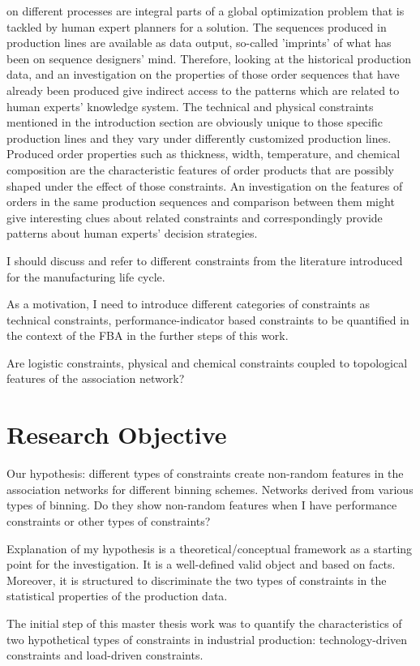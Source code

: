 {on different processes are integral parts of a global optimization problem that is tackled by human expert planners for a solution. The sequences produced in production lines are available as data output, so-called 'imprints' of what has been on sequence designers' mind. Therefore, looking at the historical production data, and an investigation on the properties of those order sequences that have already been produced give indirect access to the patterns which are related to human experts' knowledge system. The technical and physical constraints mentioned in the introduction section are obviously unique to those specific production lines and they vary under differently customized production lines. Produced order properties such as thickness, width, temperature, and chemical composition are the characteristic features of order products that are possibly shaped under the effect of those constraints. An investigation on the features of orders in the same production sequences and comparison between them might give interesting clues about related constraints and correspondingly provide patterns about human experts' decision strategies.
		
	I should discuss and refer to different constraints from the literature introduced for the manufacturing life cycle.
	
	As a motivation, I need to introduce different categories of constraints as technical constraints, performance-indicator based constraints to be quantified in the context of the FBA in the further steps of this work.
	
	Are logistic constraints, physical and chemical constraints coupled to topological features of the association network?
}

\section{Research Objective}

{\color{red} 
	Our hypothesis: different types of constraints create non-random features in the association networks for different binning schemes. Networks derived from various types of binning. Do they show non-random features when I have performance constraints or other types of constraints?
	
	Explanation of my hypothesis is a theoretical/conceptual framework as a starting point for the investigation. It is a well-defined valid object and based on facts. Moreover, it is structured to discriminate the two types of constraints in the statistical properties of the production data.
	
	The initial step of this master thesis work was to quantify the characteristics of two hypothetical types of constraints in industrial production: technology-driven constraints and load-driven constraints. 
}

